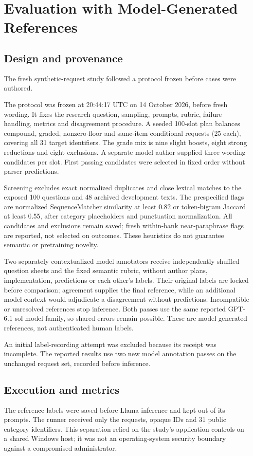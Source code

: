 \documentclass[conference]{IEEEtran}
\begin{document}
\section{Evaluation with Model-Generated References}
\subsection{Design and provenance}
The fresh synthetic-request study followed a protocol frozen before cases were authored.

The protocol was frozen at 20:44:17 UTC on 14 October 2026, before fresh wording. It fixes the research question, sampling, prompts, rubric, failure handling, metrics and disagreement procedure. A seeded 100-slot plan balances compound, graded, nonzero-floor and same-item conditional requests (25 each), covering all 31 target identifiers. The grade mix is nine slight boosts, eight strong reductions and eight exclusions. A separate model author supplied three wording candidates per slot. First passing candidates were selected in fixed order without parser predictions.

Screening excludes exact normalized duplicates and close lexical matches to the exposed 100 questions and 48 archived development texts. The prespecified flags are normalized SequenceMatcher similarity at least 0.82 or token-bigram Jaccard at least 0.55, after category placeholders and punctuation normalization. All candidates and exclusions remain saved; fresh within-bank near-paraphrase flags are reported, not selected on outcomes. These heuristics do not guarantee semantic or pretraining novelty.

Two separately contextualized model annotators receive independently shuffled question sheets and the fixed semantic rubric, without author plans, implementation, predictions or each other's labels. Their original labels are locked before comparison; agreement supplies the final reference, while an additional model context would adjudicate a disagreement without predictions. Incompatible or unresolved references stop inference. Both passes use the same reported GPT-6.1-sol model family, so shared errors remain possible. These are model-generated references, not authenticated human labels.

An initial label-recording attempt was excluded because its receipt was incomplete. The reported results use two new model annotation passes on the unchanged request set, recorded before inference.

\subsection{Execution and metrics}
The reference labels were saved before Llama inference and kept out of its prompts. The runner received only the requests, opaque IDs and 31 public category identifiers. This separation relied on the study's application controls on a shared Windows host; it was not an operating-system security boundary against a compromised administrator.
\end{document}
